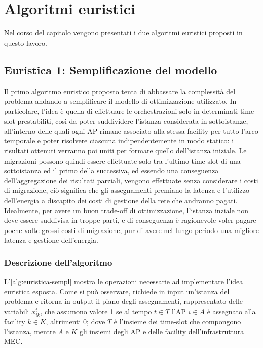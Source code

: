 \chapter{Algoritmi euristici}
\label{cap:algoritmi-euristici}

Nel corso del capitolo vengono presentati i due algoritmi euristici proposti in questo lavoro.

%
%
\section{Euristica 1: Semplificazione del modello}
\label{sec:semplificazione-modello}

Il primo algoritmo euristico proposto tenta di abbassare la complessità del problema andando a semplificare il modello di ottimizzazione utilizzato. In particolare, l'idea è quella di effettuare le orchestrazioni solo in determinati time-slot prestabiliti, così da poter suddividere l'istanza considerata in sottoistanze, all'interno delle quali ogni AP rimane associato alla stessa facility per tutto l'arco temporale e poter risolvere ciascuna indipendentemente in modo statico: i risultati ottenuti verranno poi uniti per formare quello dell'istanza iniziale. Le migrazioni possono quindi essere effettuate solo tra l'ultimo time-slot di una sottoistanza ed il primo della successiva, ed essendo una conseguenza dell'aggregazione dei risultati parziali, vengono effettuate senza considerare i costi di migrazione, ciò significa che gli assegnamenti premiano la latenza e l'utilizzo dell'energia a discapito dei costi di gestione della rete che andranno pagati. Idealmente, per avere un buon trade-off di ottimizzazione, l'istanza inziale non deve essere suddivisa in troppe parti, e di conseguenza è ragionevole voler pagare poche volte grossi costi di migrazione, pur di avere nel lungo periodo una migliore latenza e gestione dell'energia.


\subsection{Descrizione dell'algoritmo}
\label{subsec:algo-model}



L'\autoref{alg:euristica-sempl} mostra le operazioni necessarie ad implementare l'idea euristica esposta. Come si può osservare, richiede in input un'istanza del problema e ritorna in output il piano degli assegnamenti, rappresentato delle variabili $x^t_{ik}$, che assumono valore 1 se al tempo $t \in T$ l'AP $i \in A$ è assegnato alla facility $k \in K$, altrimenti 0; dove $T$ è l'insieme dei time-slot che compongono l'istanza, mentre $A$ e $K$ gli insiemi degli AP e delle facility dell'infrastruttura MEC.

